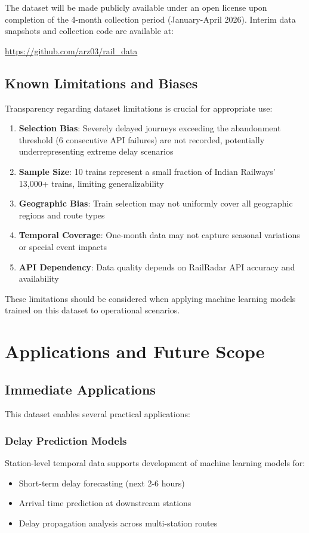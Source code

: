 \documentclass[11pt,a4paper]{article}
\begin{document}
The dataset will be made publicly available under an open license upon completion of the 4-month collection period (January-April 2026). Interim data snapshots and collection code are available at:

\begin{center}
\url{https://github.com/arz03/rail_data}
\end{center}

\subsection{Known Limitations and Biases}

Transparency regarding dataset limitations is crucial for appropriate use:

\begin{enumerate}
    \item \textbf{Selection Bias}: Severely delayed journeys exceeding the abandonment threshold (6 consecutive API failures) are not recorded, potentially underrepresenting extreme delay scenarios
    \item \textbf{Sample Size}: 10 trains represent a small fraction of Indian Railways' 13,000+ trains, limiting generalizability
    \item \textbf{Geographic Bias}: Train selection may not uniformly cover all geographic regions and route types
    \item \textbf{Temporal Coverage}: One-month data may not capture seasonal variations or special event impacts
    \item \textbf{API Dependency}: Data quality depends on RailRadar API accuracy and availability
\end{enumerate}

These limitations should be considered when applying machine learning models trained on this dataset to operational scenarios.

\section{Applications and Future Scope}

\subsection{Immediate Applications}

This dataset enables several practical applications:

\subsubsection{Delay Prediction Models}
Station-level temporal data supports development of machine learning models for:
\begin{itemize}
    \item Short-term delay forecasting (next 2-6 hours)
    \item Arrival time prediction at downstream stations
    \item Delay propagation analysis across multi-station routes
\end{itemize}
\end{document}
